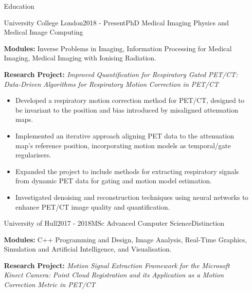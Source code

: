 \documentclass{cv}
\begin{document}
    \begin{rSection}{Education}
        \item \begin{rSubsection}{University College London}{2018 - Present}{PhD Medical Imaging Physics and Medical Image Computing}{}            
            \item \textbf{Modules:} Inverse Problems in Imaging, Information Processing for Medical Imaging, Medical Imaging with Ionising Radiation.
            
            \item \textbf{Research Project:} \textit{Improved Quantification for Respiratory Gated PET/CT: Data-Driven Algorithms for Respiratory Motion Correction in PET/CT}
            
            \item \begin{itemize}
                \item Developed a respiratory motion correction method for PET/CT, designed to be invariant to the position and bias introduced by misaligned attenuation maps.
                \item Implemented an iterative approach aligning PET data to the attenuation map’s reference position, incorporating motion models as temporal/gate regularisers.
                \item Expanded the project to include methods for extracting respiratory signals from dynamic PET data for gating and motion model estimation.
                \item Investigated denoising and reconstruction techniques using neural networks to enhance PET/CT image quality and quantification.
            \end{itemize}
        \end{rSubsection}
        
        \item \begin{rSubsection}{University of Hull}{2017 - 2018}{MSc Advanced Computer Science}{Distinction}
            \item \textbf{Modules:} C++ Programming and Design, Image Analysis, Real-Time Graphics, Simulation and Artificial Intelligence, and Visualisation.
            
            \item \textbf{Research Project:} \textit{Motion Signal Extraction Framework for the Microsoft Kinect Camera: Point Cloud Registration and its Application as a Motion Correction Metric in PET/CT}
            

\end{rSubsection}
\end{rSection}
\end{document}
